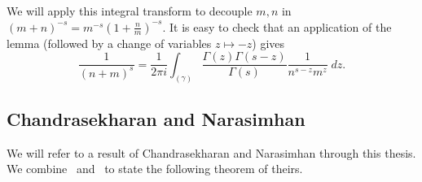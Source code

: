 We will apply this integral transform to decouple $m,n$ in $(m+n)^{-s} = m^{-s} (1 +
\tfrac{n}{m})^{-s}$.
It is easy to check that an application of the lemma (followed by a change of variables $z
\mapsto -z$) gives
\begin{equation}
  \frac{1}{(n+m)^s} = \frac{1}{2\pi i} \int_{(\gamma)}
  \frac{\Gamma(z)\Gamma(s-z)}{\Gamma(s)} \frac{1}{n^{s-z} m^z} \; dz.
\end{equation}



\subsection{Chandrasekharan and Narasimhan}


We will refer to a result of Chandrasekharan and Narasimhan through this thesis.
We combine~\cite[Theorem~4.1]{CN1} and~\cite[Theorem~1]{CN2} to state the following
theorem of theirs.


